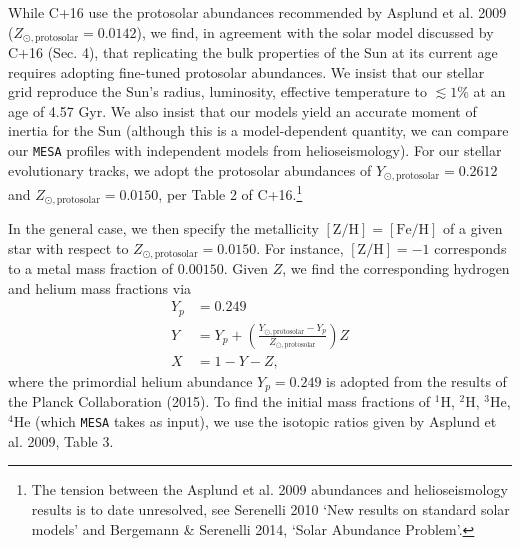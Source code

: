 \documentclass{article}
\begin{document}
While C+16 use the protosolar abundances recommended by Asplund et al. 2009 
($Z_{\odot,\mathrm{protosolar}} = 0.0142$), we find, in agreement with the 
solar model discussed by C+16 (Sec. 4), that replicating the bulk properties 
of the Sun at its current age requires adopting fine-tuned protosolar 
abundances.
We insist that our stellar grid reproduce the Sun's radius, luminosity, 
effective temperature to $\lesssim 1\%$ at an age of 4.57 Gyr.
We also insist that our models yield an accurate moment of inertia for the Sun 
(although this is a model-dependent quantity, we can compare our \texttt{MESA} 
profiles with independent models from helioseismology).
For our stellar evolutionary tracks, we adopt the protosolar abundances of
$Y_{\odot,\mathrm{protosolar}} = 0.2612$ and $Z_{\odot,\mathrm{protosolar}} = 
0.0150$, per Table 2 of C+16.\footnote{The tension between the Asplund et al. 
2009 abundances and helioseismology results is to date unresolved, see 
Serenelli 2010 `New results on standard solar models' and Bergemann \& 
Serenelli 2014, `Solar Abundance Problem'.}

In the general case, we then specify the metallicity $\mathrm{[Z/H]=[Fe/H]}$ of 
a given star with respect to $Z_{\odot,\mathrm{protosolar}} = 0.0150$. For 
instance, $\mathrm{[Z/H]=-1}$ corresponds to a metal mass fraction of $0.00150$.
Given $Z$, we find the corresponding hydrogen and helium mass fractions via
\begin{align}
Y_p &= 0.249 
\label{eq:Planck_primordial_He}\\
Y &= Y_p + 
\left(\frac{Y_{\odot,\mathrm{protosolar}}-Y_p}{Z_{\odot,\mathrm{protosolar}}} 
\right) Z \\
X &= 1 - Y - Z,
\end{align}
where the primordial helium abundance $Y_p=0.249$ is adopted from the results 
of the Planck Collaboration (2015).
To find the initial mass fractions of $\mathrm{^1H}$, $\mathrm{^2H}$, 
$\mathrm{^3 He}$, $\mathrm{^4 He}$ (which \texttt{MESA} takes as input), we 
use the isotopic ratios given by Asplund et al. 2009, Table 3.
\end{document}
